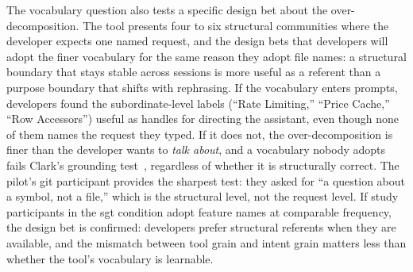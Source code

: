 
The vocabulary question also tests a specific design bet about the
over-decomposition. The tool presents four to six structural communities where
the developer expects one named request, and the design bets that developers will
adopt the finer vocabulary for the same reason they adopt file names: a
structural boundary that stays stable across sessions is more useful as a
referent than a purpose boundary that shifts with rephrasing. If the vocabulary
enters prompts, developers found the subordinate-level labels (``Rate Limiting,''
``Price Cache,'' ``Row Accessors'') useful as handles for directing the
assistant, even though none of them names the request they typed. If it does
not, the over-decomposition is finer than the developer wants to
\emph{talk about}, and a vocabulary nobody adopts fails Clark's grounding
test~\cite{clark1996}, regardless of whether it is structurally
correct. The pilot's git participant provides the sharpest test: they
asked for ``a question about a symbol, not a file,'' which is the structural
level, not the request level. If study participants in the sgt condition adopt
feature names at comparable frequency, the design bet is confirmed: developers
prefer structural referents when they are available, and the mismatch between
tool grain and intent grain matters less than whether the tool's vocabulary is
learnable.

